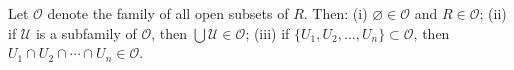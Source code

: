 Let $\mathcal{O}$ denote the family of all open subsets of $R$. Then:
(i) $\varnothing \in \mathcal{O}$ and $R \in \mathcal{O}$;
(ii) if $\mathcal{U}$ is a subfamily of $\mathcal{O}$, then $\bigcup \mathcal{U} \in \mathcal{O}$;
(iii) if $\{U_1, U_2, \ldots, U_n\} \subset \mathcal{O}$, then $U_1 \cap U_2 \cap \cdots \cap U_n \in \mathcal{O}$.